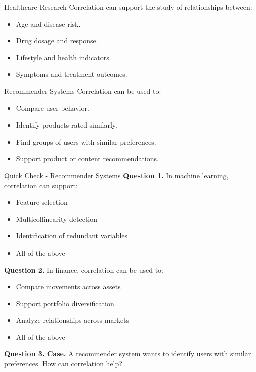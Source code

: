 \documentclass[aspectratio=169,11pt]{beamer}
\begin{document}
\begin{frame}[allowframebreaks]{Healthcare Research}
\small
Correlation can support the study of relationships between:\par\medskip
\begin{itemize}
\item Age and disease risk.
\item Drug dosage and response.
\item Lifestyle and health indicators.
\item Symptoms and treatment outcomes.
\end{itemize}
\end{frame}
\begin{frame}[allowframebreaks]{Recommender Systems}
\small
Correlation can be used to:\par\medskip
\begin{itemize}
\item Compare user behavior.
\item Identify products rated similarly.
\item Find groups of users with similar preferences.
\item Support product or content recommendations.
\end{itemize}
\end{frame}
\begin{frame}[allowframebreaks]{Quick Check - Recommender Systems}
\footnotesize
\textbf{Question 1.} In machine learning, correlation can support:\par\medskip
\begin{itemize}
\item[\textbf{A.}] Feature selection
\item[\textbf{B.}] Multicollinearity detection
\item[\textbf{C.}] Identification of redundant variables
\item[\textbf{D.}] All of the above
\end{itemize}
\textbf{Question 2.} In finance, correlation can be used to:\par\medskip
\begin{itemize}
\item[\textbf{A.}] Compare movements across assets
\item[\textbf{B.}] Support portfolio diversification
\item[\textbf{C.}] Analyze relationships across markets
\item[\textbf{D.}] All of the above
\end{itemize}
\textbf{Question 3. Case.} A recommender system wants to identify users with similar preferences. How can correlation help?\par\medskip
\end{frame}
\end{document}
